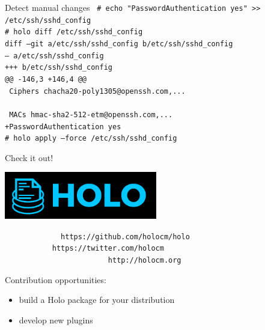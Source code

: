 \documentclass{beamer}
\begin{document}
\begin{frame}[plain,c]{Detect manual changes}
 \small\texttt{%
  {\color{holoonblack}\#} echo "PasswordAuthentication yes" >> /etc/ssh/sshd\_config\\[0.5em]
  {\color{holoonblack}\#} holo diff /etc/ssh/sshd\_config\\
  diff --git a/etc/ssh/sshd\_config b/etc/ssh/sshd\_config\\
  --- a/etc/ssh/sshd\_config\\
  +++ b/etc/ssh/sshd\_config\\
  @@ -146,3 +146,4 @@\\
  ~Ciphers~chacha20-poly1305@openssh.com,...\\
  ~\\
  ~MACs~hmac-sha2-512-etm@openssh.com,...\\
  +PasswordAuthentication yes\\[0.5em]
  {\color{holoonblack}\#} holo apply --force /etc/ssh/sshd\_config
 }
\end{frame}

\begin{frame}[plain,c]{Check it out!}
 \begin{center}
  \includegraphics[width=0.5\textwidth]{holo-logo.pdf}
 \end{center}

 \texttt{%
  ~~~~~~~~~~~~https://github.com/{\color{holoonblack}holocm}/holo\\
  ~~~~~~~~~~~https://twitter.com/{\color{holoonblack}holocm}\\
  ~~~~~~~~~~~~~~~~~~~~~~~~http://{\color{holoonblack}holocm}.org
 }

 \vspace{3em}
 \small Contribution opportunities:\vspace{-0.3em}
 \begin{itemize}
  \item build a Holo package for your distribution\vspace{-0.3em}
  \item develop new plugins
 \end{itemize}
\end{frame}
\end{document}
